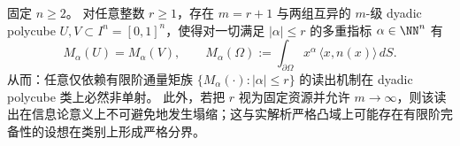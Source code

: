 \begin{theorem}\label{thm:spg-prouhet-thue-morse-obstruction-dyadic-polyclube-flux-moments}
固定 \(n\ge 2\)。
对任意整数 \(r\ge 1\)，存在 \(m=r+1\) 与两组互异的 \(m\)-级 dyadic polycube \(U,V\subset I^n=[0,1]^n\)，使得对一切满足 \(|\alpha|\le r\) 的多重指标 \(\alpha\in\NN^n\) 有
\[
M_\alpha(U)=M_\alpha(V),
\qquad
M_\alpha(\Omega):=\int_{\partial\Omega} x^\alpha\,\langle x,n(x)\rangle\,dS.
\]
从而：任意仅依赖有限阶通量矩族 \(\{M_\alpha(\cdot):|\alpha|\le r\}\) 的读出机制在 dyadic polycube 类上必然非单射。
此外，若把 \(r\) 视为固定资源并允许 \(m\to\infty\)，则该读出在信息论意义上不可避免地发生塌缩；这与实解析严格凸域上可能存在有限阶完备性的设想在类别上形成严格分界。
\end{theorem}
